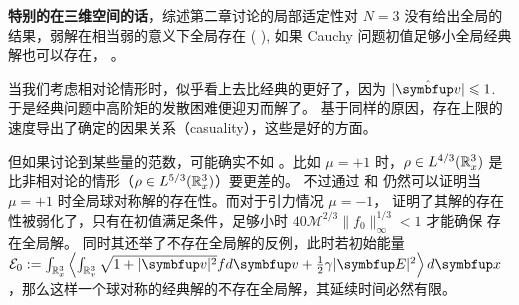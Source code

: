 \textbf{特别的在三维空间的话}，综述第二章讨论的局部适定性对 $N=3$ 没有给出全局的结果，弱解在相当弱的意义下全局存在 ( \cite*{arsenev_global_1975, abdallah_weak_1994} ), 如果 Cauchy 问题初值足够小全局经典解也可以存在， \citet*{bardos1985global}。



当我们考虑相对论情形时，\eqrvp 似乎看上去比经典的更好了，因为 $|\hat{\vv}| \leqslant 1$. 于是经典问题中高阶矩的发散困难便迎刃而解了。 
基于同样的原因，存在上限的速度导出了确定的因果关系（casuality），这些是好的方面。


但如果讨论到某些量的范数，\eqrvp 可能确实不如 \eqvp。比如 $\mu=+1$ 时，$\rho\in L^{4/3}({\mathbb{R}}_{x}^{3})$ 是比非相对论的情形（$\rho\in L^{5/3}({\mathbb{R}}_{x}^{3})$）要更差的。 不过通过 \cite*{batt1977global} 和 \cite*{wollman-1980-symmetric} 
仍然可以证明当 $\mu=+1$ 时全局球对称解的存在性。而对于引力情况 $\mu=-1$，\cite*{glassey_symmetric_1985} 证明了其解的存在性被弱化了，只有在初值满足条件，足够小时 $40\mathcal{M}^{2/3}\|f_0\|_\infty^{1/3}<1$ 才能确保 \eqrvp 存在全局解。 同时其还举了不存在全局解的反例，此时若初始能量 $\mathcal{E}_0:=\int_{\bbRx}\left\langle\int_{\bbRv} \sqrt{1+|\vect{v}|^{2}} f d \vv+\frac{1}{2} \gamma|\vE|^{2}\right\rangle d \vect{x}$，那么这样一个球对称的经典解的不存在全局解，其延续时间必然有限。 

